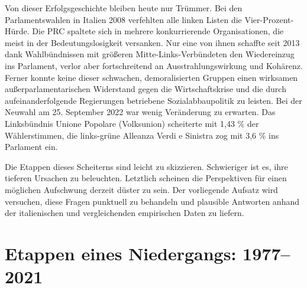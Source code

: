 \begin{multicols*}{2}
Von dieser Erfolgsgeschichte bleiben heute nur Trümmer. Bei den Parlamentswahlen in Italien 2008 verfehlten alle linken Listen die Vier-Prozent-Hürde. Die PRC spaltete sich in mehrere konkurrierende Organisationen, die meist in der Bedeutungslosigkeit versanken. Nur eine von ihnen schaffte seit 2013 dank Wahlbündnissen mit größeren Mitte-Links-Verbündeten den Wiedereinzug ins Parlament, verlor aber fortschreitend an Ausstrahlungswirkung und Kohärenz. Ferner konnte keine dieser schwachen, demoralisierten Gruppen einen wirksamen außerparlamentarischen Widerstand gegen die Wirtschaftskrise und die durch aufeinanderfolgende Regierungen betriebene Sozialabbaupolitik zu leisten. Bei der Neuwahl am 25. September 2022 war wenig Veränderung zu erwarten. Das Linksbündnis Unione Popolare (Volksunion) scheiterte mit 1,43 \% der Wählerstimmen, die links-grüne Alleanza Verdi e Sinistra zog mit 3,6 \% ins Parlament ein.

Die Etappen dieses Scheiterns sind leicht zu skizzieren. Schwieriger ist es, ihre tieferen Ursachen zu beleuchten. Letztlich scheinen die Perspektiven für einen möglichen Aufschwung derzeit düster zu sein. Der vorliegende Aufsatz wird versuchen, diese Fragen punktuell zu behandeln und plausible Antworten anhand der italienischen und vergleichenden empirischen Daten zu liefern.

\section{Etappen eines Niedergangs: 1977–2021 }


\end{multicols*}
